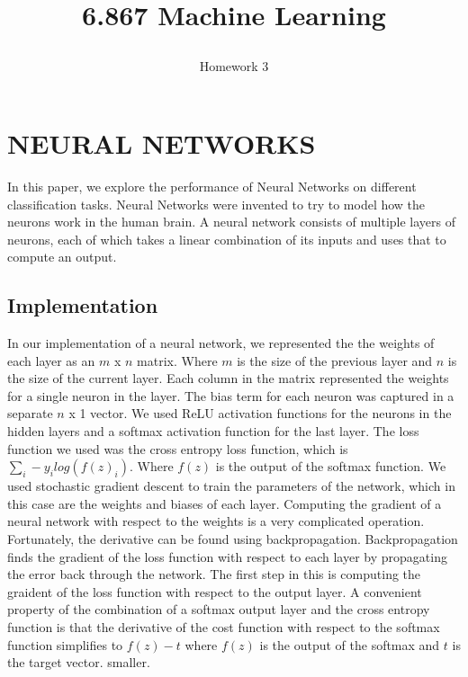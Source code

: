 \documentclass[10pt,twoside]{article}
\begin{document}
\title{6.867 Machine Learning  \subtitle{Homework 3} }

\maketitle


\section{\uppercase{Neural Networks}}

\noindent In this paper, we explore the performance of Neural Networks on different classification tasks. Neural Networks were invented to try to model how the neurons work in the human brain. A neural network consists of multiple layers of neurons, each of which takes a linear combination of its inputs and uses that to compute an output. 


\subsection{Implementation}

In our implementation of a neural network, we represented the the weights of each layer as an $m$ x $n$ matrix. Where $m$ is the size of the previous layer and $n$ is the size of the current layer. Each column in the matrix represented the weights for a single neuron in the layer. The bias term for each neuron was captured in a separate $n$ x 1 vector. We used ReLU activation functions for the neurons in the hidden layers and a softmax activation function for the last layer. The loss function we used was the cross entropy loss function, which is $\sum _i -y_i log(f(z)_i) $. Where $f(z)$ is the output of the softmax function. We used stochastic gradient descent to train the parameters of the network, which in this case are the weights and biases of each layer. Computing the gradient of a neural network with respect to the weights is a very complicated operation. Fortunately, the derivative can be found using backpropagation. Backpropagation finds the gradient of the loss function with respect to each layer by propagating the error back through the network. The first step in this is computing the graident of the loss function with respect to the output layer. A convenient property of the combination of a softmax output layer and the cross entropy function is that the derivative of the cost function with respect to the softmax function simplifies to $f(z)-t$ where $f(z)$ is the output of the softmax and $t$ is the target vector. 
\noindent smaller.
\end{document}
